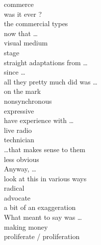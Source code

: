\documentclass[12pt]{article}
\begin{document}
commerce \\
was it ever ? \\
the commercial types \\
now that \dots \\
visual medium \\
stage \\
straight adaptations from \dots \\
since \dots \\
all they pretty much did was \dots \\
on the mark \\
nonsynchronous \\
expressive \\
have experience with \dots \\
live radio \\
technician \\
\dots that makes sense to them \\
less obvious \\
Anyway, \dots \\
look at this in various ways \\
radical \\
advocate \\
a bit of an exaggeration \\
What meant to say was \dots \\
making money \\
proliferate / proliferation \\
\end{document}
